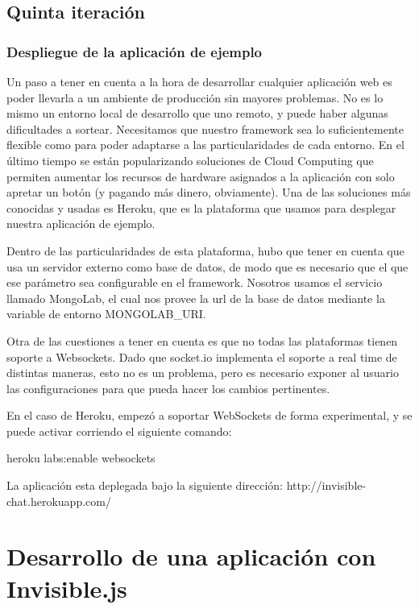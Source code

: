 \documentclass[doc,helv,longtable]{article}
\begin{document}
\subsection{Quinta iteración}
\subsubsection{Despliegue de la aplicación de ejemplo}


Un paso a tener en cuenta a la hora de desarrollar cualquier aplicación web es poder llevarla a un ambiente de producción sin mayores problemas. No es lo mismo un entorno local de desarrollo que uno remoto, y puede haber algunas dificultades a sortear. Necesitamos que nuestro framework sea lo suficientemente flexible como para poder adaptarse a las particularidades de cada entorno. En el último tiempo se están popularizando soluciones de Cloud Computing que permiten aumentar los recursos de hardware asignados a la aplicación con solo apretar un botón (y pagando más dinero, obviamente). Una de las soluciones más conocidas y usadas es Heroku\cite{heroku}, que es la plataforma que usamos para desplegar nuestra aplicación de ejemplo. 

Dentro de las particularidades de esta plataforma, hubo que tener en cuenta que usa un servidor externo como base de datos, de modo que es necesario que el que ese parámetro sea configurable en el framework. Nosotros usamos el servicio llamado MongoLab\cite{mongolab}, el cual nos provee la url de la base de datos mediante la variable de entorno MONGOLAB\_URI.

Otra de las cuestiones a tener en cuenta es que no todas las plataformas tienen soporte a Websockets. Dado que socket.io implementa el soporte a real time de distintas maneras, esto no es un problema, pero es necesario exponer al usuario las configuraciones para que pueda hacer los cambios pertinentes.

En el caso de Heroku, empezó a soportar WebSockets de forma experimental, y se puede activar corriendo el siguiente comando:

heroku labs:enable websockets

La aplicación esta deplegada bajo la siguiente dirección: http://invisible-chat.herokuapp.com/

\section{Desarrollo de una aplicación con Invisible.js}
\end{document}
